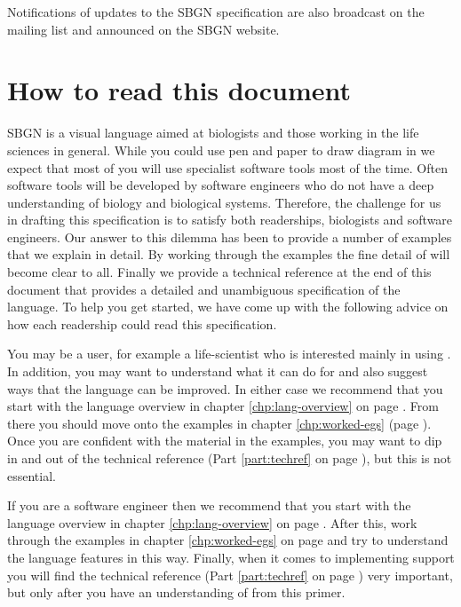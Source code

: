 Notifications of updates to the SBGN specification are also broadcast on 
the mailing list and announced on the SBGN website.

\section{How to read this document}

SBGN is a visual language aimed at biologists and those working in
the life sciences in general. While you could use pen and paper to
draw diagram in \PD we expect that most of you will use specialist
software tools most of the time. Often software tools will be
developed by software engineers who do not have a deep understanding
of biology and biological systems. Therefore, the challenge for us in
drafting this specification is to satisfy both readerships, biologists
and software engineers. Our answer to this dilemma has been to provide
a number of examples that we explain in detail. By working through the
examples the fine detail of \PD will become clear to all. Finally we
provide a technical reference at the end of this document that
provides a detailed and unambiguous specification of the language. To
help you get started, we have come up with the following
advice on how each readership could read this specification.

You may be a user, for example a life-scientist who is interested
mainly in using \PDl. In addition, you may want to understand what it
can do for and also suggest ways that the language can be improved. In
either case we recommend that you start with the language overview in
chapter \ref{chp:lang-overview} on page
\pageref{chp:lang-overview}. From there you should move onto the
examples in chapter \ref{chp:worked-egs} (page
\pageref{chp:worked-egs}). Once you are confident with the material
in the examples, you may want to dip in and out of the technical
reference (Part \ref{part:techref} on page
\pageref{part:techref}), but this is not essential.

If you are a software engineer then we recommend that you start with
the language overview in chapter \ref{chp:lang-overview} on page
\pageref{chp:lang-overview}. After this, work through the examples in
chapter \ref{chp:worked-egs} on page \pageref{chp:worked-egs} and
try to understand the language features in this way. Finally, when it
comes to implementing \PDl support you will find the technical
reference (Part \ref{part:techref} on page \pageref{part:techref})
very important, but only after you have an understanding of \PD
from this primer.




